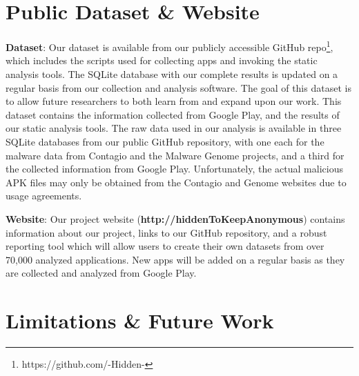 \documentclass{sig-alternate-05-2015}
\newif\ifisnopii
\begin{document}



\section{Public Dataset \& Website}
\label{sec:dataset}

\textbf{Dataset}: Our dataset is available from our publicly accessible GitHub repo\footnote{\ifisnopii https://github.com/DroidDarwin \else https://github.com/-Hidden- \fi}, which includes the scripts used for collecting apps and invoking the static analysis tools. The SQLite database with our complete results is updated on a regular basis from our collection and analysis software. The goal of this dataset is to allow future researchers to both learn from and expand upon our work. This dataset contains the information collected from Google Play, and the results of our static analysis tools. The raw data used in our analysis is available in three SQLite databases from our public GitHub repository, with one each for the malware data from Contagio and the Malware Genome projects, and a third for the collected information from Google Play. Unfortunately, the actual malicious APK files may only be obtained from the Contagio and Genome websites due to usage agreements.

\noindent
\textbf{Website}: Our project website (\textbf{\ifisnopii http://darwin.rit.edu \else http://hiddenToKeepAnonymous\fi}) contains information about our project, links to our GitHub repository, and a robust reporting tool which will allow users to create their own datasets from over 70,000 analyzed applications. New apps will be added on a regular basis as they are collected and analyzed from Google Play.


\section{Limitations \& Future Work}
\label{sec:limitations}
\end{document}
